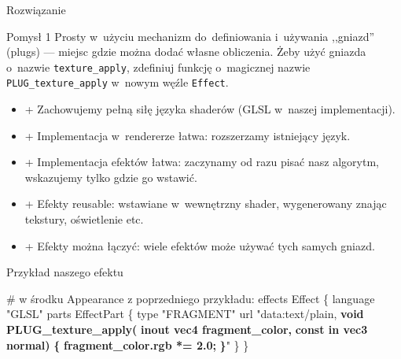 \documentclass{beamer}
\begin{document}
\begin{frame}{Rozwiązanie}

\begin{block}{Pomysł 1}
Prosty w~użyciu mechanizm do~definiowania i~używania
,,gniazd'' (plugs) --- miejsc gdzie można dodać własne obliczenia.
Żeby użyć gniazda o~nazwie \texttt{texture\_apply},
zdefiniuj funkcję o~magicznej nazwie \texttt{PLUG\_texture\_apply}
w~nowym węźle \texttt{Effect}.
\end{block}

\begin{itemize}
  \item + Zachowujemy pełną siłę języka shaderów (GLSL w~naszej implementacji).
  \item + Implementacja w~rendererze łatwa: rozszerzamy istniejący język.
  \item + Implementacja efektów łatwa: zaczynamy od razu pisać nasz algorytm,
    wskazujemy tylko gdzie go wstawić.
  \item + Efekty reusable: wstawiane w~wewnętrzny shader, wygenerowany
    znając tekstury, oświetlenie etc.
  \item + Efekty można łączyć: wiele efektów może używać tych samych gniazd.
\end{itemize}
\end{frame}

\begin{frame}[fragile]
\begin{exampleblock}{Przykład naszego efektu}
\begin{semiverbatim}
# w środku Appearance z poprzedniego przykładu:
effects Effect \{
  language "GLSL"
  parts EffectPart \{
    type "FRAGMENT"
    url "data:text/plain,
\textbf{    void PLUG\_texture\_apply(}
\textbf{      inout vec4 fragment\_color,}
\textbf{      const in vec3 normal)}
\textbf{    \{}
\textbf{      fragment\_color.rgb *= 2.0;}
\textbf{    \}}"
  \}
\}
\end{semiverbatim}
\end{exampleblock}
\end{frame}

\renewcommand*{\figurename}{Obraz}
\end{document}
